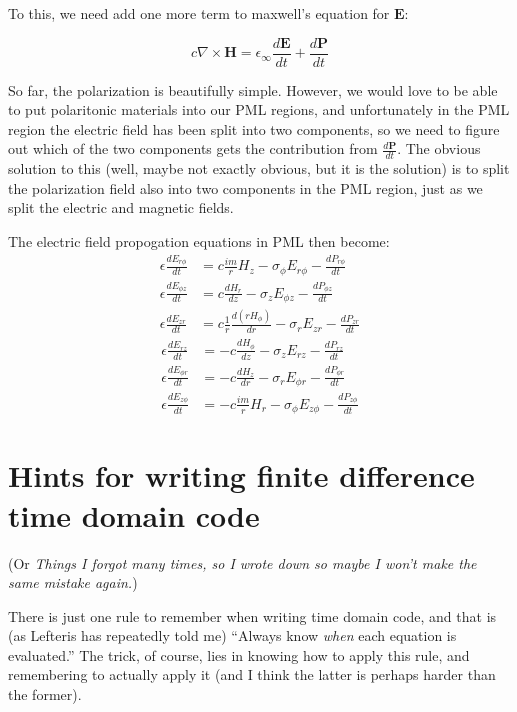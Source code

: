 \documentclass[floats]{book}
\begin{document}
To this, we need add one more term to maxwell's equation for $\mathbf E$:

\begin{equation}
c \nabla \times \mathbf{H} = \epsilon_\infty \frac{d\mathbf{E}}{dt}
 + \frac{d\mathbf{P}}{dt}
\end{equation}

So far, the polarization is beautifully simple.  However, we would love to
be able to put polaritonic materials into our PML regions, and
unfortunately in the PML region the electric field has been split into two
components, so we need to figure out which of the two components gets the
contribution from $\frac{d\mathbf{P}}{dt}$.  The obvious solution to this
(well, maybe not exactly obvious, but it is the solution) is to split the
polarization field also into two components in the PML region, just as we
split the electric and magnetic fields.

The electric field propogation equations in PML then become:
\begin{align}
\epsilon\frac{dE_{r\phi}}{dt} &=   c \frac{im}r H_z
             - \sigma_\phi E_{r\phi} - \frac{dP_{r\phi}}{dt} \\
\epsilon\frac{dE_{\phi z}}{dt} &=   c \frac{dH_r}{dz}
             - \sigma_z E_{\phi z} - \frac{dP_{\phi z}}{dt} \\
\epsilon\frac{dE_{zr}}{dt} &=   c \frac1r\frac{d(rH_\phi)}{dr}
             - \sigma_r E_{zr} - \frac{dP_{zr}}{dt}
\end{align}
\begin{align}
\epsilon\frac{dE_{rz}}{dt} &= -c\frac{dH_\phi}{dz}
             - \sigma_z E_{rz} - \frac{dP_{rz}}{dt}\\
\epsilon\frac{dE_{\phi r}}{dt} &=-c \frac{dH_z}{dr}
             - \sigma_r E_{\phi r} - \frac{dP_{\phi r}}{dt} \\
\epsilon\frac{dE_{z\phi}}{dt} &=-c \frac{im}r H_r \label{polariton_pml}
             - \sigma_\phi E_{z\phi} - \frac{dP_{z\phi}}{dt}
\end{align}

\chapter{Hints for writing finite difference time domain code}

(Or \emph{Things I forgot many times, so I wrote down so maybe I won't make
  the same mistake again.})

There is just one rule to remember when writing time domain code, and that
is (as Lefteris has repeatedly told me) ``Always know \emph{when} each
equation is evaluated.''  The trick, of course, lies in knowing how to
apply this rule, and remembering to actually apply it (and I think the
latter is perhaps harder than the former).
\end{document}
